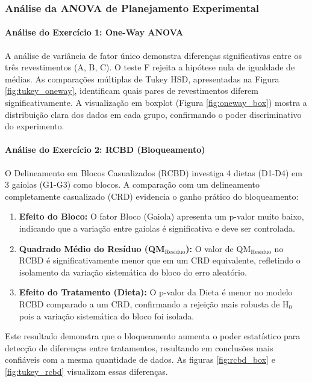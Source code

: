 \documentclass[12pt,a4paper,oneside]{article}
\begin{document}
\subsubsection{Análise da ANOVA de Planejamento Experimental}

\paragraph{Análise do Exercício 1: One-Way ANOVA}

A análise de variância de fator único demonstra diferenças significativas entre os três revestimentos (A, B, C). O teste F rejeita a hipótese nula de igualdade de médias. As comparações múltiplas de Tukey HSD, apresentadas na Figura \ref{fig:tukey_oneway}, identificam quais pares de revestimentos diferem significativamente. A visualização em boxplot (Figura \ref{fig:oneway_box}) mostra a distribuição clara dos dados em cada grupo, confirmando o poder discriminativo do experimento.

\paragraph{Análise do Exercício 2: RCBD (Bloqueamento)}

O Delineamento em Blocos Casualizados (RCBD) investiga 4 dietas (D1-D4) em 3 gaiolas (G1-G3) como blocos. A comparação com um delineamento completamente casualizado (CRD) evidencia o ganho prático do bloqueamento:

\begin{enumerate}
    \item \textbf{Efeito do Bloco:} O fator Bloco (Gaiola) apresenta um p-valor muito baixo, indicando que a variação entre gaiolas é significativa e deve ser controlada.
    \item \textbf{Quadrado Médio do Resíduo (QM$_{\text{Resíduo}}$):} O valor de QM$_{\text{Resíduo}}$ no RCBD é significativamente menor que em um CRD equivalente, refletindo o isolamento da variação sistemática do bloco do erro aleatório.
    \item \textbf{Efeito do Tratamento (Dieta):} O p-valor da Dieta é menor no modelo RCBD comparado a um CRD, confirmando a rejeição mais robusta de H$_0$ pois a variação sistemática do bloco foi isolada.
\end{enumerate}

Este resultado demonstra que o bloqueamento aumenta o poder estatístico para detecção de diferenças entre tratamentos, resultando em conclusões mais confiáveis com a mesma quantidade de dados. As figuras \ref{fig:rcbd_box} e \ref{fig:tukey_rcbd} visualizam essas diferenças.
\end{document}

